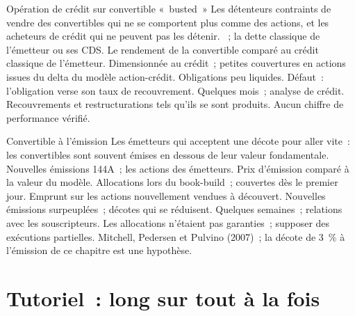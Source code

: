 \begin{strategyfile}{Opération de crédit sur convertible «~busted~»}\label{strat:s2:convertible-arbitrage:busted}
 Les détenteurs contraints de vendre des convertibles qui ne se comportent plus comme des actions, et les acheteurs de crédit qui ne peuvent pas les détenir.
 ~; la dette classique de l'émetteur ou ses CDS.
 Le rendement de la convertible comparé au crédit classique de l'émetteur.
 Dimensionnée au crédit~; petites couvertures en actions issues du delta du modèle action-crédit.
 Obligations peu liquides.
 Défaut~: l'obligation verse son taux de recouvrement.
 Quelques mois~; analyse de crédit.
 Recouvrements et restructurations tels qu'ils se sont produits.
 Aucun chiffre de performance vérifié.
\end{strategyfile}

\begin{strategyfile}{Convertible à l'émission}\label{strat:s2:convertible-arbitrage:newissue}
 Les émetteurs qui acceptent une décote pour aller vite~: les convertibles sont souvent émises en dessous de leur valeur fondamentale.
 Nouvelles émissions 144A~; les actions des émetteurs.
 Prix d'émission comparé à la valeur du modèle.
 Allocations lors du book-build~; couvertes dès le premier jour.
 Emprunt sur les actions nouvellement vendues à découvert.
 Nouvelles émissions surpeuplées~; décotes qui se réduisent.
 Quelques semaines~; relations avec les souscripteurs.
 Les allocations n'étaient pas garanties~; supposer des exécutions partielles.
 Mitchell, Pedersen et Pulvino (2007)~; la décote de 3~\% à l'émission de ce chapitre est une hypothèse.
\end{strategyfile}

\section{Tutoriel~: long sur tout à la fois}\label{tut:s2:convertible-arbitrage:tut}

